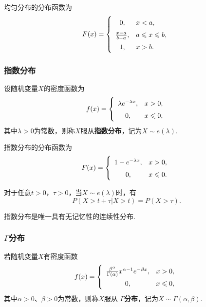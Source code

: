 \begin{theorem}
均匀分布的分布函数为\begin{equation}
F(x) = \left\{ \def\arraystretch{1.5}
\begin{array}{cl}
0, & x < a, \\
\frac{x-a}{b-a}, & a \leqslant x \leqslant b, \\
1, & x > b. \\
\end{array} \right.
\end{equation}
\end{theorem}

\subsubsection{指数分布}
\begin{definition}
设随机变量\(X\)的密度函数为\begin{equation}
f(x) = \left\{ \def\arraystretch{1.5}
\begin{array}{cl}
\lambda e^{-\lambda x}, & x > 0, \\
0, & x \leqslant 0, \\
\end{array} \right.
\end{equation}其中\(\lambda > 0\)为常数，则称\(X\)服从\textbf{指数分布}，记为\(X \sim e(\lambda)\).
\end{definition}

\begin{theorem}
指数分布的分布函数为\begin{equation}
F(x) = \left\{ \def\arraystretch{1.5}
\begin{array}{cl}
1 - e^{-\lambda x}, & x > 0, \\
0, & x \leqslant 0. \\
\end{array} \right.
\end{equation}
\end{theorem}

\begin{theorem}[指数分布的无记忆性]
对于任意\(t > 0\)，\(\tau > 0\)，当\(X \sim e(\lambda)\)时，有\[
P(X > t + \tau \vert X > t) = P(X > \tau).
\]

指数分布是唯一具有无记忆性的连续性分布.
\end{theorem}

\subsubsection{\texorpdfstring{\(\Gamma\)}{Γ}分布}
\begin{definition}
若随机变量\(X\)有密度函数\begin{equation}
f(x) = \left\{
\def\arraystretch{1.5}
\begin{array}{cl}
\frac{\beta^{\alpha}}{\Gamma(\alpha)} x^{\alpha-1} e^{-\beta x}, & x > 0, \\
0, & x \leqslant 0, \\
\end{array} \right.
\end{equation}其中\(\alpha > 0\)、\(\beta > 0\)为常数，则称\(X\)服从\textbf{ \(\Gamma\)分布}，记为\(X \sim \Gamma(\alpha,\beta)\).
\end{definition}

